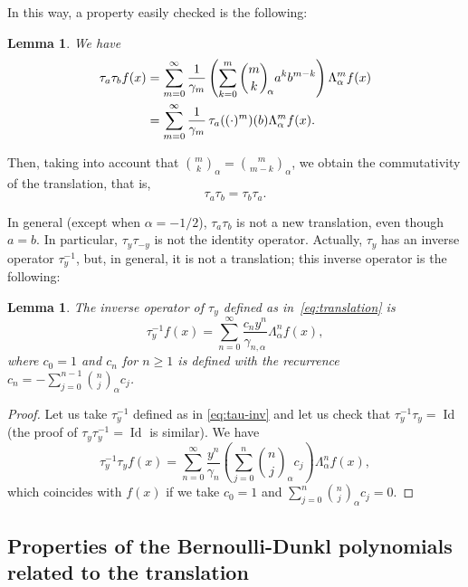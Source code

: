 \documentclass[10pt]{article}
\theoremstyle{plain}
\newtheorem{lemma}[theorem]{Lemma}
\theoremstyle{definition}
\numberwithin{equation}{section} %
\newcommand{\La}{\Lambda_{\alpha}}
\newcommand{\binoma}[2]{\binom{#1}{#2}_{\!\alpha}}
\newcommand{\cc}{\gamma}
\begin{document}
In this way, a property easily checked is the following:

\begin{lemma}
We have
\begin{align}
  \label{eq:tauab}
  \tau_a \tau_b f (x) 
  &= \sum_{m=0}^{\infty} \frac{1}{\cc_{m}} 
  \left( \sum_{k=0}^m \binoma{m}{k} a^k b^{m-k} \right) \La^m f(x) \\
  &= \sum_{m=0}^{\infty} \frac{1}{\cc_{m}} 
  \,\tau_a((\cdot)^m)(b) \La^m f(x).
  \notag
\end{align}
\end{lemma}

Then, taking into account that $\binoma{m}{k} = \binoma{m}{m-k}$, we obtain the commutativity of the translation, that is,
\begin{equation*}
  \tau_a \tau_b = \tau_b \tau_a.
\end{equation*}

In general (except when $\alpha=-1/2$), $\tau_a \tau_b$ is not a new translation, even though $a=b$. In particular, $\tau_y \tau_{-y}$ is not the identity operator. Actually, $\tau_y$ has an inverse operator $\tau_y^{-1}$, but, in general, it is not a translation; this inverse operator is the following:

\begin{lemma}
The inverse operator of $\tau_y$ defined as in~\eqref{eq:translation} is 
\begin{equation}
\label{eq:tau-inv}
  \tau_y^{-1} f(x) = \sum_{n=0}^\infty \frac{c_n y^n}{\cc_{n,\alpha}}\La^{n}f(x),
\end{equation}
where $c_0 = 1$ and $c_n$ for $n\ge1$ is defined with the recurrence $c_n = -\sum_{j=0}^{n-1} \binoma{n}{j} c_j$.
\end{lemma}

\begin{proof}
Let us take $\tau_y^{-1}$ defined as in \eqref{eq:tau-inv} and let us check that $\tau_y^{-1} \tau_y = \operatorname{Id}$ (the proof of $\tau_y \tau_y^{-1} = \operatorname{Id}$ is similar). We have
\[
  \tau_y^{-1} \tau_y f(x) = \sum_{n=0}^\infty \frac{y^n}{\cc_{n}} 
  \left( \sum_{j=0}^{n} \binoma{n}{j} c_j \right) \La^{n}f(x),
\]
which coincides with $f(x)$ if we take $c_0=1$ and $\sum_{j=0}^{n} \binoma{n}{j} c_j = 0$.
\end{proof}

\subsection{Properties of the Bernoulli-Dunkl polynomials related to the translation}
\end{document}
